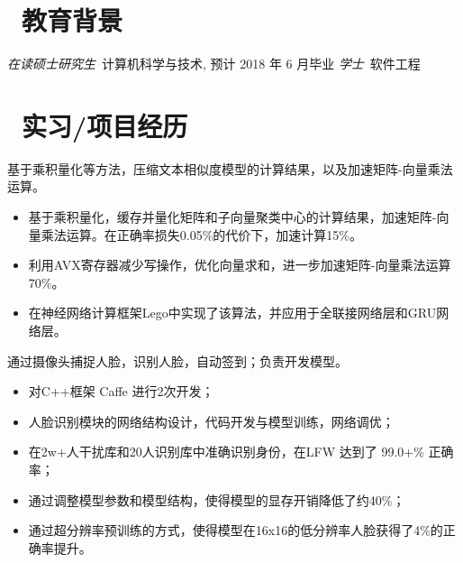 \documentclass{resume}
\begin{document}


 
\section{\faGraduationCap\ 教育背景}
\textit{在读硕士研究生}\ 计算机科学与技术, 预计 2018 年 6 月毕业
\textit{学士}\ 软件工程

\section{\faUsers\ 实习/项目经历}

基于乘积量化等方法，压缩文本相似度模型的计算结果，以及加速矩阵-向量乘法运算。
\begin{onehalfspacing}
\begin{itemize}
  \item 基于乘积量化，缓存并量化矩阵和子向量聚类中心的计算结果，加速矩阵-向量乘法运算。在正确率损失0.05\%的代价下，加速计算15\%。
  \item 利用AVX寄存器减少写操作，优化向量求和，进一步加速矩阵-向量乘法运算70\%。
  \item 在神经网络计算框架Lego中实现了该算法，并应用于全联接网络层和GRU网络层。
\end{itemize}
\end{onehalfspacing}

\begin{onehalfspacing}
通过摄像头捕捉人脸，识别人脸，自动签到；负责开发模型。
\begin{itemize}
  \item 对C++框架 Caffe 进行2次开发；
  \item 人脸识别模块的网络结构设计，代码开发与模型训练，网络调优；
  \item 在2w+人干扰库和20人识别库中准确识别身份，在LFW 达到了 99.0+\% 正确率；
  \item 通过调整模型参数和模型结构，使得模型的显存开销降低了约40\%；
  \item 通过超分辨率预训练的方式，使得模型在16x16的低分辨率人脸获得了4\%的正确率提升。
\end{itemize}
\end{onehalfspacing}
\end{document}
